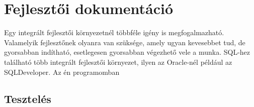 
\chapter{Fejlesztői dokumentáció}

Egy integrált fejlesztői környezetnél többféle igény is megfogalmazható. Valamelyik fejlesztőnek olyanra van szüksége,
amely ugyan kevesebbet tud, de gyorsabban indítható, esetlegesen gyorsabban végezhető vele a munka.
SQL-hez található több integrált fejlesztői környezet, ilyen az Oracle-nél például az SQLDeveloper.
Az én programomban

\section{Tesztelés}
